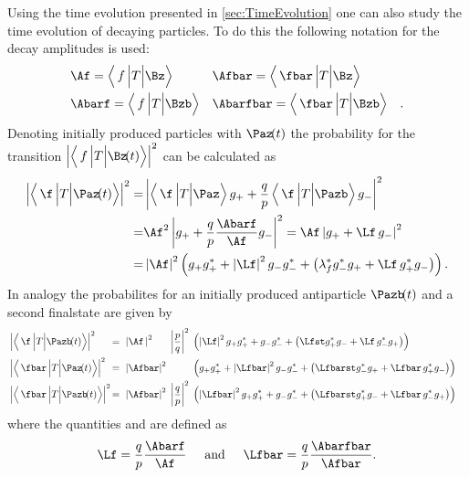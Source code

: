 Using the time evolution presented in \cref{sec:TimeEvolution} one can also study the time evolution of decaying particles.
To do this the following notation for the decay amplitudes is used:
\begin{equation}
\begin{aligned}
&\Af = \left<\,f\,\Big|T\Big|\Bz\right>&&\Afbar = \left<\,\fbar\,\Big|T\Big|\Bz\right>&\\
&\Abarf = \left<\,f\,\Big|T\Big|\Bzb\right>&&\Abarfbar = \left<\,\fbar\,\Big|T\Big|\Bzb\right>&.
\end{aligned}
\end{equation}
Denoting initially produced particles with $\Paz\!(t)$ the probability for the transition $\left|\left<\,f\,\Big|T\Big|\Bz\!(t)\right>\right|^2$ can be calculated as
\begin{align}
\left|\left<\,\f\,\Big|T\Big|\Paz\!(t)\right>\right|^2 =&
\left|\left<\,\f\,\Big|T\Big|\Paz\right>g_++\frac{q}{p}\left<\,\f\,\Big|T\Big|\Pazb\right>g_-\right|^2\nonumber\\
=&\Af^2\left|g_+ + \frac{q}{p}\frac{\Abarf}{\Af} g_-\right|^2=\Af\left|g_+ +\Lf\,g_-\right|^2\nonumber\\
=&\left|\Af\right|^2\left(g_+g_+^*+\left|\Lf\right|^2g_-g_-^*+\left(\lambda_{f}^*g_-^*g_+ + \Lf\,g_+^* g_-\right)\right).
\end{align}
In analogy the probabilites for an initially produced antiparticle $\Pazb\!(t)$ and a second finalstate \fbar are given by
\begin{align}
&\left|\left<\,\f\,\Big|T\Big|\Pazb\!(t)\right>\right|^2&\kern -8.5pt{=}
&\kern 6.0pt{\left|\Af\,\right|^2}&&\kern -5.5pt{\left|\frac{p}{q}\right|^2}& &\kern -5.5pt{\left(\left|\Lf\right|^2g_+g_+^*+g_-g_-^*+\left(\Lfst g_+^*g_- + \Lf\,g_-^* g_+\right)\right)}&\\
&\left|\left<\,\fbar\,\Big|T\Big|\Paz\!(t)\right>\right|^2&\kern -8.5pt{=}
&\kern 6.0pt{\left|\Afbar\right|^2}& && &\kern -5.5pt{\left(g_+g_+^*+\left|\Lfbar\right|^2g_-g_-^*+\left(\Lfbarst g_-^*g_+ + \Lfbar\,g_+^* g_-\right)\right)}&\\
&\left|\left<\,\fbar\,\Big|T\Big|\Pazb\!(t)\right>\right|^2&\kern -8.5pt{=}
&\kern 6.0pt{\left|\Afbar\right|^2}& &\kern -5.5pt{\left|\frac{q}{p}\right|^2}& &\kern -5.5pt{\left(\left|\Lfbar\right|^2g_+g_+^*+g_-g_-^*+\left(\Lfbarst g_+^*g_- + \Lfbar\,g_-^* g_+\right)\right)}&
\end{align}
where the quantities \Lf and \Lfbar are defined as
\begin{equation}
\Lf=\frac{q}{p}\frac{\Abarf}{\Af}\hspace{0.5cm}\text{and}
\hspace{0.5cm}\Lfbar=\frac{q}{p}\frac{\Abarfbar}{\Afbar}.\label{eq:defLambdas}
\end{equation}
